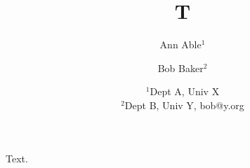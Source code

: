 \documentclass{article}
\author{Ann Able$^1$ \and Bob Baker$^2$}
\title{T}
\date{$^1$Dept A, Univ X\\ $^2$Dept B, Univ Y, bob@y.org}
\begin{document}
\maketitle
Text.
\end{document}
